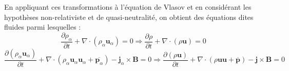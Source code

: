 En appliquant ces transformations à l'équation de Vlasov et en considérant les hypothèses non-relativiste et de quasi-neutralité, on obtient des équations dites fluides parmi lesquelles :
\begin{equation}
 \frac{\partial \rho_{\alpha}}{\partial t} + \nabla \cdot (\rho_{\alpha} \mathbf{u}_{\alpha}) = 0 \Rightarrow \frac{\partial \rho}{\partial t} + \nabla \cdot (\rho \mathbf{u}) = 0 \label{eq:model_0}
 \end{equation}
\begin{equation}
\frac{\partial (\rho_{\alpha} \mathbf{u}_{\alpha})}{\partial t} + \nabla \cdot (\rho_{\alpha} \mathbf{u}_{\alpha}\mathbf{u}_{\alpha} + \overline{\mathbf{p}_{\alpha}}) - \mathbf{j}_{\alpha} \times \mathbf{B} = 0 \Rightarrow \frac{\partial (\rho \mathbf{u})}{\partial t} + \nabla \cdot (\rho \mathbf{u}\mathbf{u} + \overline{\mathbf{p}}) - \mathbf{j} \times \mathbf{B} = 0 \label{eq:model_1}
\end{equation}


